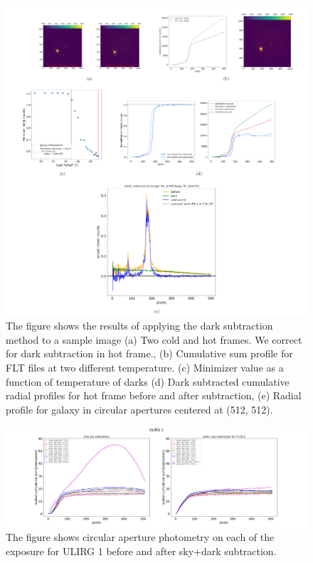 \documentclass[11pt]{article}
\begin{document}
\begin{figure}
 \includegraphics[scale=0.40]{dark_sub.png}

\caption{The figure shows the results of applying the dark subtraction method to a sample image
(a) Two cold and hot frames. We correct for dark subtraction in hot frame., (b) Cumulative sum profile for FLT files at two different temperature. (c) Minimizer value as a function of temperature of darks (d) Dark subtracted cumulative radial profiles for hot frame before and after subtraction, (e) Radial profile for galaxy in circular apertures centered at (512, 512). \label{fig:O-VI}}
\end{figure}



\begin{figure}
 \includegraphics[scale=0.30]{gal1_photometry_FLT_subtracted_final.png}

\caption{The figure shows circular aperture photometry on each of the exposure for ULIRG 1 before and after sky+dark subtraction. \label{fig:gal1}
 }
\end{figure}
\end{document}
